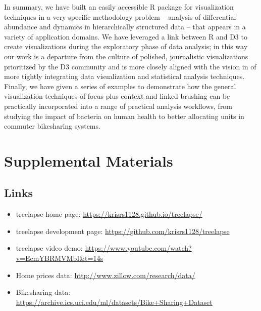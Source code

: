\documentclass[12pt]{article}
\begin{document}
In summary, we have built an easily accessible R package for visualization
techniques in a very specific methodology problem -- analysis of differential
abundance and dynamics in hierarchically structured data -- that appears in a
variety of application domains. We have leveraged a link between R and D3
\citep{vaidyanathan2014htmlwidgets} to create visualizations during the
exploratory phase of data analysis; in this way our work is a departure from the
culture of polished, journalistic visualizations prioritized by the D3 community
and is more closely aligned with the vision in \citep{de2003visual} of more
tightly integrating data visualization and statistical analysis techniques.
Finally, we have given a series of examples to demonstrate how the general
visualization techniques of focus-plus-context and linked brushing can be
practically incorporated into a range of practical analysis workflows, from
studying the impact of bacteria on human health to better allocating units in
commuter bikesharing systems.




\section{Supplemental Materials}

\subsection{Links}
\label{sec:supp_links}

\begin{itemize}
\item treelapse home page: \url{https://krisrs1128.github.io/treelapse/}
\item treelapse development page: \url{https://github.com/krisrs1128/treelapse}
\item treelapse video demo: \url{https://www.youtube.com/watch?v=EcmYBRMVMbI&t=14s}
\item Home prices data: \url{http://www.zillow.com/research/data/}
\item Bikesharing data: \url{https://archive.ics.uci.edu/ml/datasets/Bike+Sharing+Dataset}
\end{itemize}
\end{document}
